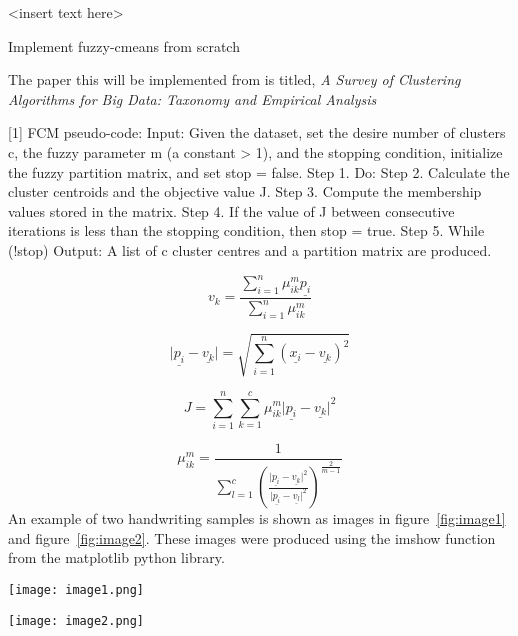 <insert text here>

Implement fuzzy-cmeans from scratch

The paper this will be implemented from is titled, \textit{A Survey of Clustering Algorithms for Big Data: Taxonomy and Empirical Analysis}


[1]  
FCM pseudo-code:  
Input: Given the dataset, set the desire number of clusters c, the fuzzy parameter m (a constant > 1), and the stopping condition, initialize the fuzzy partition matrix, and set stop = false.  
Step 1. Do:  
Step 2. Calculate the cluster centroids and the objective value J.
Step 3. Compute the membership values stored in the matrix.  
Step 4. If the value of J between consecutive iterations is less than the stopping condition, then stop = true.  
Step 5. While (!stop)  
Output: A list of c cluster centres and a partition matrix are produced.   

\begin{equation}
\label{eq:vk}
v_{k}=\frac{\sum_{i=1}^n{{\mu^{m}_{{i}{k}}{{\underline{p_{i}}}}}}}{\sum_{i=1}^n{{\mu^{m}_{{i}{k}}}}}
\end{equation}
   
\begin{equation}
\label{eq:distance}     
{\vert{\underline{p_{i}}}-{\underline{v_{k}}}\vert}=\sqrt{\sum_{i=1}^{n}{({\underline{x_{i}}}-{\underline{v_{k}}})^2}}
\end{equation}
  
\begin{equation}
\label{eq:objective_function}
J=\sum_{i=1}^{n}{\sum_{k=1}^{c}{\mu^{m}_{{i}{k}}{\vert{\underline{p_{i}}}-{\underline{v_{k}}}\vert^{2}}}}
\end{equation}  

\begin{equation}
\label{eq:membership_value}
{\mu^{m}_{{i}{k}}}=\frac{1}{\sum_{l=1}^{c}{(\frac{{\vert{\underline{p_{i}}}-{\underline{v_{k}}}\vert^{2}}}{{\vert{\underline{p_{i}}}-{\underline{v_{l}}}\vert^{2}}})}^{\frac{2}{m-1}}}
\end{equation}
An example of two handwriting samples is shown as images in figure~\ref{fig:image1} and figure~\ref{fig:image2}. These images were produced using the imshow function from the matplotlib python library.\newline

\begin{center}
\texttt{[image: image1.png]}
\end{center}

\begin{center}
\texttt{[image: image2.png]}
\end{center}    
        